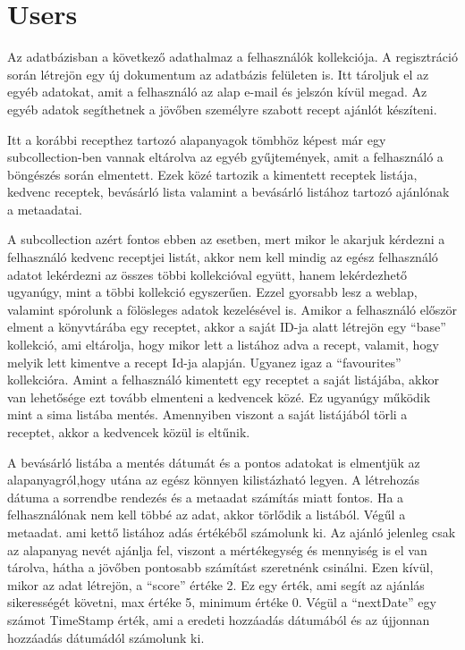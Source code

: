 \documentclass[12pt]{report}
\theoremstyle{definition}
\begin{document}
\section{Users}
Az adatbázisban a következő adathalmaz a felhasználók kollekciója. A regisztráció során létrejön egy új dokumentum az adatbázis felületen is. Itt tároljuk el az egyéb adatokat, amit a felhasználó az alap e-mail és jelszón kívül megad. Az egyéb adatok segíthetnek a jövőben személyre szabott recept ajánlót készíteni.

Itt a korábbi recepthez tartozó alapanyagok tömbhöz képest már egy subcollection-ben vannak eltárolva az egyéb gyűjtemények, amit a felhasználó a böngészés során elmentett. Ezek közé tartozik a kimentett receptek listája, kedvenc receptek, bevásárló lista valamint a bevásárló listához tartozó ajánlónak a metaadatai.

A subcollection azért fontos ebben az esetben, mert mikor le akarjuk kérdezni a felhasználó kedvenc receptjei listát, akkor nem kell mindig az egész felhasználó adatot lekérdezni az összes többi kollekcióval együtt, hanem lekérdezhető ugyanúgy, mint a többi kollekció egyszerűen. Ezzel gyorsabb lesz a weblap, valamint spórolunk a fölösleges adatok kezelésével is. Amikor a felhasználó először elment a könyvtárába egy receptet, akkor a saját ID-ja alatt létrejön egy “base” kollekció, ami eltárolja, hogy mikor lett a listához adva a recept, valamit, hogy melyik lett kimentve a recept Id-ja alapján. Ugyanez igaz a “favourites” kollekcióra. Amint a felhasználó kimentett egy receptet a saját listájába, akkor van lehetősége ezt tovább elmenteni a kedvencek közé. Ez ugyanúgy működik mint a sima listába mentés. Amennyiben viszont a saját listájából törli a receptet, akkor a kedvencek közül is eltűnik. 

A bevásárló listába a mentés dátumát és a pontos adatokat is elmentjük az alapanyagról,hogy utána az egész könnyen kilistázható legyen. A létrehozás dátuma a sorrendbe rendezés és a metaadat számítás miatt fontos. Ha a felhasználónak nem kell többé az adat, akkor törlődik a listából. Végűl a metaadat. ami kettő listához adás értékéből számolunk ki. Az ajánló jelenleg csak az alapanyag nevét ajánlja fel, viszont a mértékegység és mennyiség is el van tárolva, hátha a jövőben pontosabb számítást szeretnénk csinálni. Ezen kívül, mikor az adat létrejön, a “score” értéke 2. Ez egy érték, ami segít az ajánlás sikerességét követni, max értéke 5, minimum értéke 0. Végül a “nextDate” egy számot TimeStamp érték, ami a eredeti hozzáadás dátumából és az újjonnan hozzáadás dátumádól számolunk ki.
\end{document}
